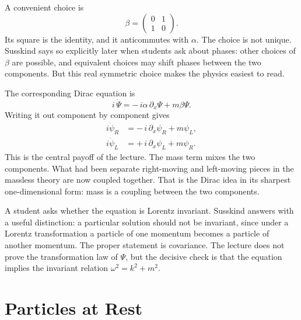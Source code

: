 A convenient choice is
\begin{equation}
\beta=\begin{pmatrix}0&1\\1&0\end{pmatrix}.
\end{equation}
Its square is the identity, and it anticommutes with \(\alpha\). The choice is not unique. Susskind says so explicitly later when students ask about phases: other choices of \(\beta\) are possible, and equivalent choices may shift phases between the two components. But this real symmetric choice makes the physics easiest to read.

The corresponding Dirac equation is
\begin{equation}
i\,\dot{\Psi}
=
-\,i\alpha\,\partial_x\Psi
+
m\beta\Psi.
\end{equation}
Writing it out component by component gives
\begin{align}
i\dot{\psi}_R &= -\,i\,\partial_x\psi_R + m\psi_L,\\
i\dot{\psi}_L &= +\,i\,\partial_x\psi_L + m\psi_R.
\end{align}
This is the central payoff of the lecture. The mass term mixes the two components. What had been separate right-moving and left-moving pieces in the massless theory are now coupled together. That is the Dirac idea in its sharpest one-dimensional form: mass is a coupling between the two components.

\begin{remark}
A student asks whether the equation is Lorentz invariant. Susskind answers with a useful distinction: a particular solution should not be invariant, since under a Lorentz transformation a particle of one momentum becomes a particle of another momentum. The proper statement is covariance. The lecture does not prove the transformation law of \(\Psi\), but the decisive check is that the equation implies the invariant relation \(\omega^2=k^2+m^2\).
\end{remark}

\section{Particles at Rest}


